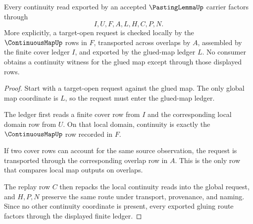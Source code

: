 \begin{theorem}
\label{thm:pasting-lemma-continuity-gluing-route}
Every continuity read exported by an accepted $\PastingLemmaUp$ carrier factors through
$$
I,U,F,A,L,H,C,P,N.
$$
More explicitly, a target-open request is checked locally by the $\ContinuousMapUp$ rows in $F$, transported across overlaps by $A$, assembled by the finite cover ledger $I$, and exported by the glued-map ledger $L$. No consumer obtains a continuity witness for the glued map except through those displayed rows.
\end{theorem}
\begin{proof}
Start with a target-open request against the glued map. The only global map coordinate is $L$, so the request must enter the glued-map ledger.

The ledger first reads a finite cover row from $I$ and the corresponding local domain row from $U$. On that local domain, continuity is exactly the $\ContinuousMapUp$ row recorded in $F$.

If two cover rows can account for the same source observation, the request is transported through the corresponding overlap row in $A$. This is the only row that compares local map outputs on overlaps.

The replay row $C$ then repacks the local continuity reads into the global request, and $H,P,N$ preserve the same route under transport, provenance, and naming. Since no other continuity coordinate is present, every exported gluing route factors through the displayed finite ledger.
\end{proof}

